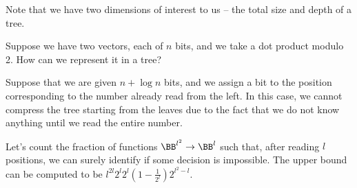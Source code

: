 \documentclass[11pt]{scrartcl}
\begin{document}
  Note that we have two dimensions of interest to us -- the total size
  and depth of a tree.

  Suppose we have two vectors, each of $n$ bits, and we take a dot
  product modulo 2. How can we represent it in a tree?

  Suppose that we are given $n+\log n$ bits, and we assign a bit to
  the position corresponding to the number already read from the left.
  In this case, we cannot compress the tree starting from the leaves
  due to the fact that we do not know anything until we read the
  entire number.

  Let's count the fraction of functions $\BB^{l^{2}} \to \BB^{l}$ such
  that, after reading $l$ positions, we can surely identify if some
  decision is impossible. The upper bound can be computed to be
  $l^{2l}2^{l}2^{l}(1-\frac{1}{2^{l}})2^{l^{2} - l}$.
\end{document}
